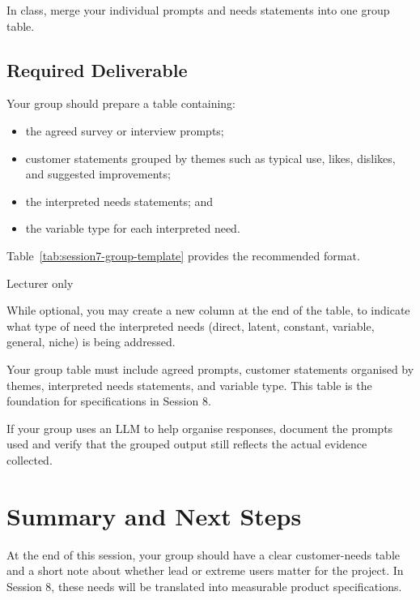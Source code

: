 In class, merge your individual prompts and needs statements into one group table.

\subsection{Required Deliverable}

Your group should prepare a table containing:
\begin{itemize}
    \item the agreed survey or interview prompts;
    \item customer statements grouped by themes such as typical use, likes, dislikes, and suggested improvements;
    \item the interpreted needs statements; and
    \item the variable type for each interpreted need.
\end{itemize}

Table~\ref{tab:session7-group-template} provides the recommended format.





Lecturer only


While optional, you may create a new column at the end of the table, to indicate what type of need the interpreted needs (direct, latent, constant, variable, general, niche) is being addressed.

\begin{tcolorbox}[title=Checkpoint]
Your group table must include agreed prompts, customer statements organised by themes, interpreted needs statements, and variable type. This table is the foundation for specifications in Session 8.
\end{tcolorbox}


If your group uses an LLM to help organise responses, document the prompts used and verify that the grouped output still reflects the actual evidence collected.

\section{Summary and Next Steps}

At the end of this session, your group should have a clear customer-needs table and a short note about whether lead or extreme users matter for the project. In Session 8, these needs will be translated into measurable product specifications.
